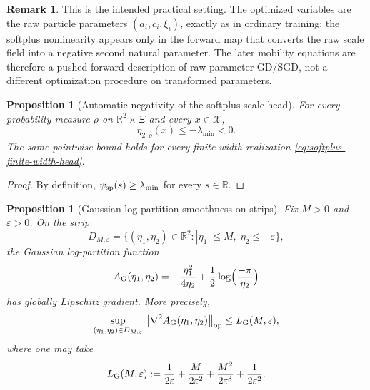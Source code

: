 \documentclass[11pt]{article}
\newtheorem{proposition}[theorem]{Proposition}
\theoremstyle{definition}
\newtheorem{remark}[theorem]{Remark}
\newcommand{\R}{\mathbb{R}}
\newcommand{\norm}[1]{\left\lVert #1 \right\rVert}
\newcommand{\mc}[1]{\mathcal{#1}}
\begin{document}
\begin{remark}
This is the intended practical setting. The optimized variables are the raw
particle parameters $(a_i,c_i,\xi_i)$, exactly as in ordinary training; the
softplus nonlinearity appears only in the forward map that converts the raw
scale field into a negative second natural parameter. The later mobility
equations are therefore a pushed-forward description of raw-parameter GD/SGD,
not a different optimization procedure on transformed parameters.
\end{remark}

\begin{proposition}[Automatic negativity of the softplus scale head]
\label{prop:softplus-domain}
For every probability measure $\rho$ on $\R^2\times\Xi$ and every $x\in\mc{X}$,
\[
  \eta_{2,\rho}(x)\le -\lambda_{\min}<0.
\]
The same pointwise bound holds for every finite-width realization
\eqref{eq:softplus-finite-width-head}.
\end{proposition}

\begin{proof}
By definition, $\psi_{\rm sp}(s)\ge \lambda_{\min}$ for every $s\in\R$.
\end{proof}

\begin{proposition}[Gaussian log-partition smoothness on strips]
\label{prop:gaussian-smoothness}
Fix $M>0$ and $\varepsilon>0$. On the strip
  \[
  D_{M,\varepsilon}
  =
  \{(\eta_1,\eta_2)\in \R^2: |\eta_1|\le M,\; \eta_2\le -\varepsilon\},
  \]
the Gaussian log-partition function
\[
  A_{\rm G}(\eta_1,\eta_2)
  =
  -\frac{\eta_1^2}{4\eta_2}
  + \frac12 \log\!\Big(\frac{-\pi}{\eta_2}\Big)
\]
has globally Lipschitz gradient. More precisely,
\begin{equation}
  \sup_{(\eta_1,\eta_2)\in D_{M,\varepsilon}}
  \norm{\nabla^2 A_{\rm G}(\eta_1,\eta_2)}_{\mathrm{op}}
  \le
  L_{\rm G}(M,\varepsilon),
\end{equation}
where one may take
\begin{equation}
  L_{\rm G}(M,\varepsilon)
  :=
  \frac{1}{2\varepsilon}
  +
  \frac{M}{2\varepsilon^2}
  +
  \frac{M^2}{2\varepsilon^3}
  +
  \frac{1}{2\varepsilon^2}.
\end{equation}
\end{proposition}
\end{document}
